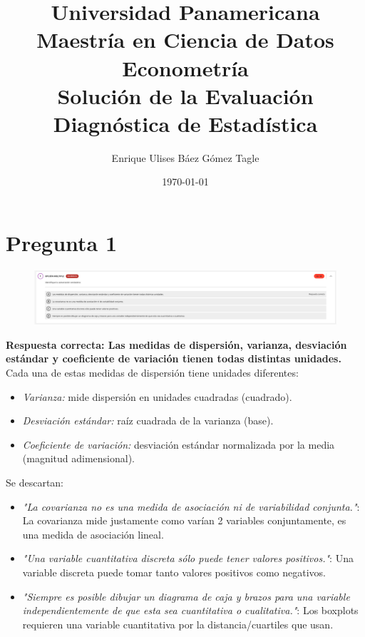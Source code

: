 \documentclass[10pt]{article}
\title{Universidad Panamericana \\ Maestría en Ciencia de Datos \\ Econometría \\ \vspace{0.5cm} Solución de la Evaluación Diagnóstica de Estadística}
\author{Enrique Ulises Báez Gómez Tagle}
\date{\today}
\begin{document}
\maketitle

\tableofcontents
\newpage
\section{Pregunta 1}
\begin{figure}[H]
	\centering
	\includegraphics[width=1\textwidth]{images/pregunta1.png}
\end{figure}
\textbf{Respuesta correcta: Las medidas de dispersión, varianza, desviación estándar y coeficiente de variación tienen todas distintas unidades.}\\
Cada una de estas medidas de dispersión tiene unidades diferentes:\\
\begin{itemize}
    \item \textit{Varianza:} mide dispersión en unidades cuadradas (cuadrado).
    \item \textit{Desviación estándar:} raíz cuadrada de la varianza (base).
    \item \textit{Coeficiente de variación:} desviación estándar normalizada por la media (magnitud adimensional).
\end{itemize}
Se descartan:
\begin{itemize}
    \item \textit{"La covarianza no es una medida de asociación ni de variabilidad conjunta."}: La covarianza mide justamente como varían 2 variables conjuntamente, es una medida de asociación lineal.
    \item \textit{"Una variable cuantitativa discreta sólo puede tener valores positivos."}: Una variable discreta puede tomar tanto valores positivos como negativos.
    \item \textit{"Siempre es posible dibujar un diagrama de caja y brazos para una variable independientemente de que esta sea cuantitativa o cualitativa."}: Los boxplots requieren una variable cuantitativa por la distancia/cuartiles que usan.
\end{itemize}
\end{document}

